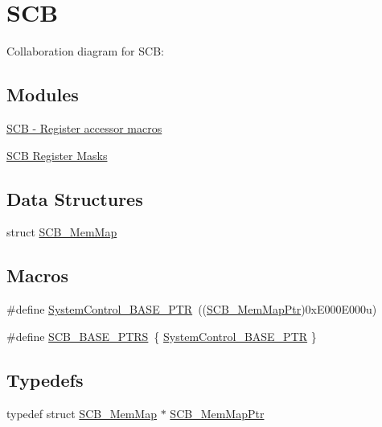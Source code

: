 \hypertarget{group___s_c_b___peripheral}{}\section{S\+CB}
\label{group___s_c_b___peripheral}
Collaboration diagram for S\+CB\+:
\subsection*{Modules}
\begin{DoxyCompactItemize}
\item 
\hyperlink{group___s_c_b___register___accessor___macros}{S\+C\+B -\/ Register accessor macros}
\item 
\hyperlink{group___s_c_b___register___masks}{S\+C\+B Register Masks}
\end{DoxyCompactItemize}
\subsection*{Data Structures}
\begin{DoxyCompactItemize}
\item 
struct \hyperlink{struct_s_c_b___mem_map}{S\+C\+B\+\_\+\+Mem\+Map}
\end{DoxyCompactItemize}
\subsection*{Macros}
\begin{DoxyCompactItemize}
\item 
\#define \hyperlink{group___s_c_b___peripheral_gaf22864785770f832103e904244e078cb}{System\+Control\+\_\+\+B\+A\+S\+E\+\_\+\+P\+TR}~((\hyperlink{group___s_c_b___peripheral_ga08aca299c99cac47121d9e64e7b8e1cf}{S\+C\+B\+\_\+\+Mem\+Map\+Ptr})0x\+E000\+E000u)
\item 
\#define \hyperlink{group___s_c_b___peripheral_gaf74b4dbfa6fd0a5607314e170a0c1d48}{S\+C\+B\+\_\+\+B\+A\+S\+E\+\_\+\+P\+T\+RS}~\{ \hyperlink{group___s_c_b___peripheral_gaf22864785770f832103e904244e078cb}{System\+Control\+\_\+\+B\+A\+S\+E\+\_\+\+P\+TR} \}
\end{DoxyCompactItemize}
\subsection*{Typedefs}
\begin{DoxyCompactItemize}
\item 
typedef struct \hyperlink{struct_s_c_b___mem_map}{S\+C\+B\+\_\+\+Mem\+Map} $\ast$ \hyperlink{group___s_c_b___peripheral_ga08aca299c99cac47121d9e64e7b8e1cf}{S\+C\+B\+\_\+\+Mem\+Map\+Ptr}
\end{DoxyCompactItemize}


